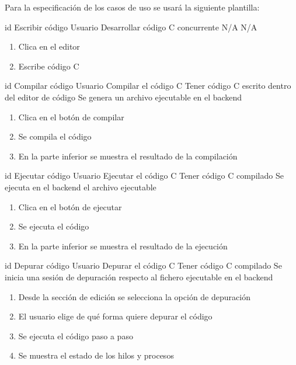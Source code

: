 
Para la especificación de los casos de uso se usará la siguiente plantilla:

\printuctemplate{}

\begin{useCase}{id}
    {Escribir código} %
    {Usuario} %
    {Desarrollar código C concurrente}  %
    {N/A}  %
    {N/A} %
    \begin{enumerate} %
        \item Clica en el editor
        \item Escribe código C 
    \end{enumerate}
\end{useCase}

\begin{useCase}{id}
    {Compilar código}
    {Usuario}
    {Compilar el código C}
    {Tener código C escrito dentro del editor de código}
    {Se genera un archivo ejecutable en el backend}
    \begin{enumerate}
        \item Clica en el botón de compilar
        \item Se compila el código
        \item En la parte inferior se muestra el resultado de la compilación
    \end{enumerate}
\end{useCase}

\begin{useCase}{id}
    {Ejecutar código}
    {Usuario}
    {Ejecutar el código C}
    {Tener código C compilado}
    {Se ejecuta en el backend el archivo ejecutable}
    \begin{enumerate}
        \item Clica en el botón de ejecutar
        \item Se ejecuta el código
        \item En la parte inferior se muestra el resultado de la ejecución
    \end{enumerate}
\end{useCase}

\begin{useCase}{id}
    {Depurar código}
    {Usuario}
    {Depurar el código C}
    {Tener código C compilado}
    {Se inicia una sesión de depuración respecto al fichero ejecutable en el backend}
    \begin{enumerate}
        \item Desde la sección de edición se selecciona la opción de depuración
        \item El usuario elige de qué forma quiere \gls{depurar} el código
        \item Se ejecuta el código paso a paso
        \item Se muestra el estado de los \glspl{hilo} y procesos
    \end{enumerate}
\end{useCase}

